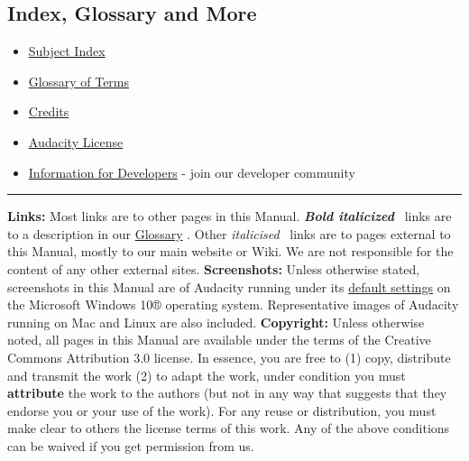 \begin{multicols}{2}
\section{Index, Glossary and More}
\begin{itemize}
\item 
\hyperref[\foo{man_subject_index_}]{Subject Index}

\item 
\hyperref[\foo{man_glossary_}]{Glossary of Terms}

\item 
\hyperref[\foo{man_credits_}]{Credits}

\end{itemize}

\begin{itemize}
\item 
\hyperref[\foo{man_license_}]{Audacity License}

\item 
\hyperref[\foo{man_information_for_developers_}]{Information for Developers}
 - join our developer community
\end{itemize}

\label{index_misc_bottom}\vspace{1mm}\hrule \textbf{Links:} Most links are to other pages in this Manual. \textit{\textbf{Bold italicized}}  links are to a description in our 
\hyperref[\foo{man_glossary_}]{Glossary}
. Other \textit{italicised}  links are to pages external to this Manual, mostly to our main website or Wiki. We are not responsible for the content of any other external sites.    
\textbf{Screenshots:} Unless otherwise stated, screenshots in this Manual are of Audacity running 
under its 
\hyperref[\foo{man_preferences_stored}]{default settings}
 on the Microsoft Windows 10® operating system. Representative images of Audacity running on Mac and Linux are also included. 
\textbf{Copyright:} Unless otherwise noted, all pages in this Manual are available under the terms of the Creative Commons Attribution 3.0 license. In essence, you are free to (1) copy, distribute and transmit the work (2) to adapt the work, under condition you must \textbf{attribute} the work to the authors (but not in any way that suggests that they endorse you or your use of the work). For any reuse or distribution, you must make clear to others the license terms of this work. Any of the above conditions can be waived if you get permission from us.
\end{multicols}